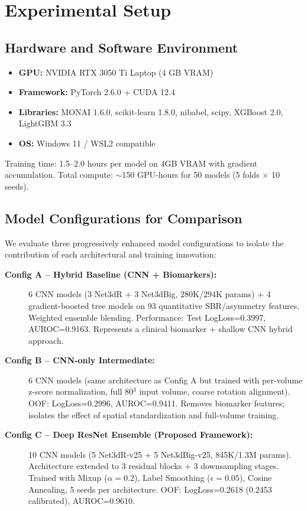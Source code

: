 \section{Experimental Setup}
\label{sec:experiments}

\subsection{Hardware and Software Environment}
\label{sec:hardware}

\begin{itemize}
    \item \textbf{GPU:} NVIDIA RTX 3050 Ti Laptop (4 GB VRAM)
    \item \textbf{Framework:} PyTorch 2.6.0 + CUDA 12.4
    \item \textbf{Libraries:} MONAI 1.6.0, scikit-learn 1.8.0, nibabel, scipy, XGBoost 2.0, LightGBM 3.3
    \item \textbf{OS:} Windows 11 / WSL2 compatible
\end{itemize}

Training time: 1.5--2.0 hours per model on 4GB VRAM with gradient accumulation. Total compute: $\sim$150 GPU-hours for 50 models (5 folds $\times$ 10 seeds).

\subsection{Model Configurations for Comparison}
\label{sec:configurations}

We evaluate three progressively enhanced model configurations to isolate the contribution of each architectural and training innovation:

\begin{description}
    \item[\textbf{Config A -- Hybrid Baseline (CNN + Biomarkers):}] 6 CNN models (3 Net3dR + 3 Net3dBig, 280K/294K params) + 4 gradient-boosted tree models on 93 quantitative SBR/asymmetry features. Weighted ensemble blending. Performance: Test LogLoss=0.3997, AUROC=0.9163. Represents a clinical biomarker + shallow CNN hybrid approach.
    
    \item[\textbf{Config B -- CNN-only Intermediate:}] 6 CNN models (same architecture as Config A but trained with per-volume z-score normalization, full 80$^3$ input volume, coarse rotation alignment). OOF: LogLoss=0.2996, AUROC=0.9411. Removes biomarker features; isolates the effect of spatial standardization and full-volume training.
    
    \item[\textbf{Config C -- Deep ResNet Ensemble (Proposed Framework):}] 10 CNN models (5 Net3dR-v25 + 5 Net3dBig-v25, 845K/1.3M params). Architecture extended to 3 residual blocks + 3 downsampling stages. Trained with Mixup ($\alpha=0.2$), Label Smoothing ($\epsilon=0.05$), Cosine Annealing, 5 seeds per architecture. OOF: LogLoss=0.2618 (0.2453 calibrated), AUROC=0.9610.
\end{description}

